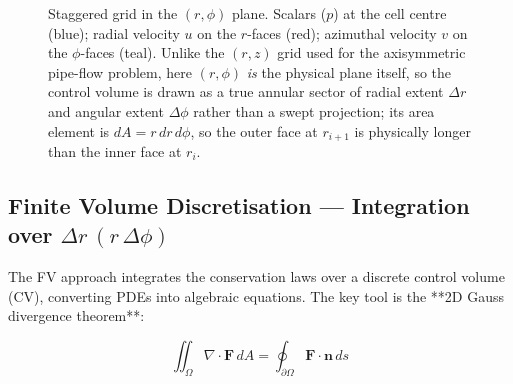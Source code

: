\begin{figure}[H]
\caption{Staggered grid in the $(r,\phi)$ plane. Scalars ($p$) at the cell centre (blue);
         radial velocity $u$ on the $r$-faces (red); azimuthal velocity $v$ on the
         $\phi$-faces (teal). Unlike the $(r,z)$ grid used for the axisymmetric
         pipe-flow problem, here $(r,\phi)$ \emph{is} the physical plane itself, so the
         control volume is drawn
         as a true annular sector of radial extent $\Delta r$ and angular extent
         $\Delta\phi$ rather than a swept projection; its area element is
         $dA = r\,dr\,d\phi$, so the outer face at $r_{i+1}$ is physically longer than
         the inner face at $r_i$.}
\label{fig:cyl_uv_grid}
\end{figure}

\subsection{Finite Volume Discretisation --- Integration over $\Delta r\,(r\,\Delta\phi)$}

The FV approach integrates the conservation laws over a discrete control volume (CV), converting PDEs into algebraic equations. The key tool is the **2D Gauss divergence theorem**:

\begin{equation}
    \iint_{\Omega} \nabla \cdot \mathbf{F} \, dA = \oint_{\partial\Omega} \mathbf{F} \cdot \mathbf{n} \, ds
\end{equation}

